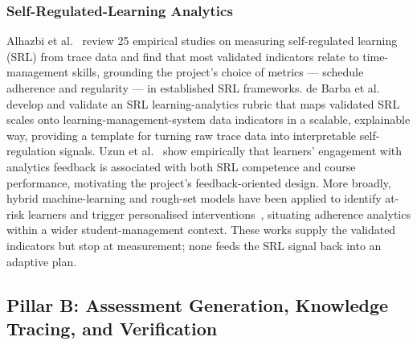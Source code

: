 \documentclass[12pt]{report}
\begin{document}
\subsubsection{Self-Regulated-Learning Analytics}
Alhazbi et al.~\cite{alhazbi2024} review 25 empirical studies on measuring self-regulated
learning (SRL) from trace data and find that most validated indicators relate to
time-management skills, grounding the project's choice of metrics --- schedule adherence
and regularity --- in established SRL frameworks. de Barba et al.~\cite{debarba2025}
develop and validate an SRL learning-analytics rubric that maps validated SRL scales onto
learning-management-system data indicators in a scalable, explainable way, providing a
template for turning raw trace data into interpretable self-regulation signals. Uzun et
al.~\cite{uzun2025} show empirically that learners' engagement with analytics feedback is
associated with both SRL competence and course performance, motivating the project's
feedback-oriented design. More broadly, hybrid machine-learning and rough-set models have
been applied to identify at-risk learners and trigger personalised
interventions~\cite{butt2025}, situating adherence analytics within a wider
student-management context. These works supply the validated indicators but stop at
measurement; none feeds the SRL signal back into an adaptive plan.

\subsection{Pillar B: Assessment Generation, Knowledge Tracing, and Verification}
\end{document}
